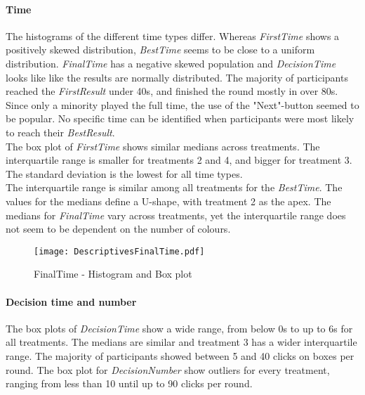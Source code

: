 \paragraph{Time}
\label{ch:Evaluation:sec:DescriptiveStatistics:subsec:Time}

The histograms of the different time types differ. Whereas \textit{FirstTime} shows a positively skewed distribution, \textit{BestTime} seems to be close to a uniform distribution. \textit{FinalTime} has a negative skewed population and \textit{DecisionTime} looks like like the results are normally distributed. The majority of participants reached the \textit{FirstResult} under 40s, and finished the round mostly in over 80s. Since only a minority played the full time, the use of the "Next"-button seemed to be popular. No specific time can be identified when participants were most likely to reach their \textit{BestResult}.\\
The box plot of \textit{FirstTime} shows similar medians across treatments. The interquartile range is smaller for treatments 2 and 4, and bigger for treatment 3. The standard deviation is the lowest for all time types.\\
The interquartile range is similar among all treatments for the \textit{BestTime}. The values for the medians define a U-shape, with treatment 2 as the apex. The medians for \textit{FinalTime} vary across treatments, yet the interquartile range does not seem to be dependent on the number of colours.\\

\begin{figure}[htbp] %
\begin{center} 
\texttt{[image: DescriptivesFinalTime.pdf]}
  \caption{FinalTime - Histogram and Box plot}
    \label{DistributionFinalTime} 
\end{center}
\end{figure}

\paragraph{Decision time and number}
The box plots of \textit{DecisionTime} show a wide range, from below 0s to up to 6s for all treatments. The medians are similar and treatment 3 has a wider interquartile range. The majority of participants showed between 5 and 40 clicks on boxes per round. The box plot for \textit{DecisionNumber} show outliers for every treatment, ranging from less than 10 until up to 90 clicks per round.

